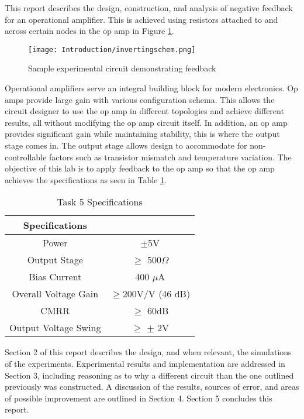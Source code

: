 



	
This report describes the design, construction, and analysis of negative feedback for an operational amplifier. This is achieved using  resistors attached to and across certain nodes in the op amp in Figure \ref{fig:sample}.


\begin{figure}[H]
	\begin{center}
		\texttt{[image: Introduction/invertingschem.png]}
		\caption{Sample experimental circuit demonstrating feedback}
		\label{fig:sample}
	\end{center}
\end{figure}
	
	
	
	
	
Operational amplifiers serve an integral building block for modern electronics. Op amps provide large gain with various configuration schema. This allows the circuit designer to use the op amp in different topologies and achieve different results, all without modifying the op amp circuit itself. In addition, an op amp provides significant gain while maintaining stability, this is where the output stage comes in. The output stage allows design to accommodate for non-controllable factors such as transistor mismatch and temperature variation.   The objective of this lab is to apply feedback to the op amp so that the op amp achieves the specifications as seen in Table \ref{tab:labspecs}.

\begin{table}[H]
	\centering
	\caption{Task 5 Specifications}
	\label{tab:labspecs}
	\begin{tabular}{|c|c|}
			\hline
			\textbf{Specifications} &                 \\ \hline
			Power                   & $\pm$5V         \\ \hline
			Output Stage 			& $\geq$ 500$\Omega$ \\ \hline
			Bias Current            & 400 $\mu$A      \\ \hline
			Overall Voltage Gain    & $\geq$200V/V (46 dB)  \\ \hline
			CMRR                    & $\geq$ 60dB     \\ \hline
			Output Voltage Swing    & $\geq$ $\pm$ 2V \\ \hline
		\end{tabular}
\end{table}

\noindent Section 2 of this report describes the design, and when relevant, the simulations of the experiments. Experimental results and implementation are addressed in Section 3, including reasoning as to why a different circuit than the one outlined previously was constructed. A discussion of the results, sources of error, and areas of possible improvement are outlined in Section 4. Section 5 concludes this report. 



